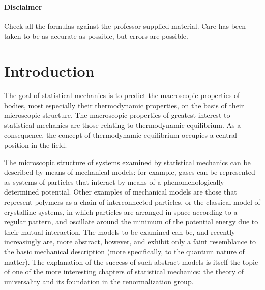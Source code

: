 \documentclass[9pt, a4paper, twoside, openright]{book}
\begin{document}
\frontmatter

\tableofcontents
\pagestyle{plain}
\subsubsection*{Disclaimer}
Check all the formulas against the professor-supplied material. Care has been taken to be as accurate as possible, but errors are possible.
\chapter{Introduction}

The goal of statistical mechanics is to predict the macroscopic properties of bodies, most especially their thermodynamic properties, on the basis of their microscopic structure.
The macroscopic properties of greatest interest to statistical mechanics are those relating to thermodynamic equilibrium. As a consequence, the concept of thermodynamic equilibrium occupies a central position in the field. 

The microscopic structure of systems examined by statistical mechanics can be described by means of mechanical models: for example, gases can be represented as systems of particles that interact by means of a phenomenologically determined potential. Other examples of mechanical models are those that represent polymers as a chain of interconnected particles, or the classical model of crystalline systems, in which particles are arranged in space according to a regular pattern, and oscillate around the minimum of the potential energy due to their mutual interaction. The models to be examined can be, and recently increasingly are, more abstract, however, and exhibit only a faint resemblance to the basic mechanical description (more specifically, to the quantum nature of matter). The explanation of the success of such abstract models is itself the topic of one of the more interesting chapters of statistical mechanics: the theory of universality and its foundation in the renormalization group.
\end{document}
